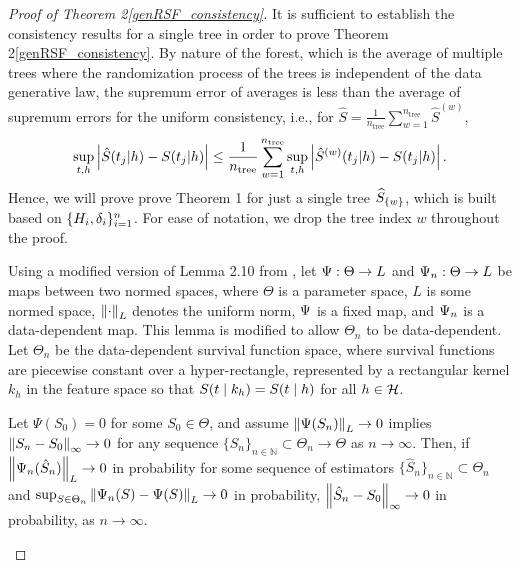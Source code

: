 %

\begin{proof}[Proof of Theorem \ifnum{} 2\else \ref{genRSF_consistency}\fi]
It is sufficient to establish the consistency results for a single tree in order to prove Theorem \ifnum{} 2\else \ref{genRSF_consistency}\fi. By nature of the forest, which is the average of multiple trees where the randomization process of the trees is independent of the data generative law, the supremum error of averages is less than the average of supremum errors for the uniform consistency, i.e., for $\hat{S} = \frac{1}{n_\text{tree}} \sum_{w=1}^{n_\text{tree}} \hat{S}^{(w)}$, $$\sup_{t,h} \left\lvert\hat{S}(t_j|h) - S(t_j|h)\right\rvert \leq \frac{1}{n_\text{tree}}  \sum_{w=1}^{n_\text{tree}} \sup_{t,h} \left\lvert\hat{S}^{(w)}(t_j|h) - S(t_j|h)\right\rvert.$$
Hence, we will prove prove Theorem 1 for just a single tree $\widehat{S}_{\{w\}}$, which is built based on $\{H_{i}, \delta_{i}\}_{i=1}^n$. For ease of notation, we drop the tree index $w$ throughout the proof. %

Using a modified version of Lemma 2.10 from \cite{kosorok_introduction_2008}, let $\Psi: \Theta \rightarrow L$ and $\Psi_n: \Theta \rightarrow L$ be maps between two normed spaces, where $\Theta$ is a parameter space, $L$ is some normed space, $\left\lVert\cdot\right\rVert_L$ denotes the uniform norm, $\Psi$ is a fixed map, and $\Psi_n$ is a data-dependent map. This lemma is modified to allow $\Theta_n$ to be data-dependent. Let $\Theta_n$ be the data-dependent survival function space, where survival functions are piecewise constant over a hyper-rectangle, represented by a rectangular kernel $k_h$ in the feature space so that $S(t\mid k_h) = S(t\mid h)$ for all $h \in \mathcal{H}$. 

%
\begin{lemma}
\label{lemma:ChoLemma1}
Let $\Psi(S_0) = 0$ for some $S_0 \in \Theta$, and assume $\left\lVert\Psi(S_n)\right\rVert_L \to 0$ implies $\left\lVert S_n - S_0\right\rVert_\infty \to 0$ for any sequence $\{S_n\}_{n \in \mathbb{N}} \subset \Theta_n \to \Theta$ as $n \to \infty$. Then, if $\left\lVert\Psi_n(\hat{S}_n)\right\rVert_L \to 0$ in probability for some sequence of estimators $\{\hat{S}_n\}_{n \in \mathbb{N}} \subset \Theta_n$ and $\sup_{S \in \Theta_n} \left\lVert\Psi_n(S) - \Psi(S)\right\rVert_L \to 0$ in probability, $\left\lVert\hat{S}_n - S_0\right\rVert_\infty \to 0$ in probability, as $n \to \infty$.
\end{lemma}


\end{proof}
